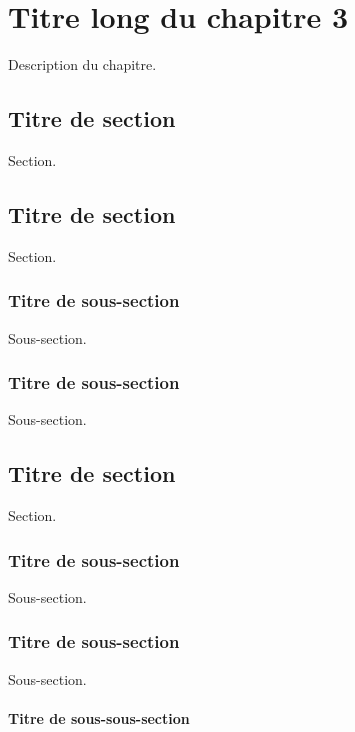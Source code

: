 \chapter[Titre court du chapitre 3] 
        {\singlespacing%
         Titre long du chapitre 3}
         \label{ch:chapitre-3}

    Description du chapitre.

\section{Titre de section}

    Section.

\section{Titre de section}
        
    Section.
        
    \subsection{Titre de sous-section}
    
    Sous-section.
    
    \subsection{Titre de sous-section}

    Sous-section.
        
\section{Titre de section}

    Section.
        
    \subsection{Titre de sous-section}
    
    Sous-section.
    
    \subsection{Titre de sous-section}
    
    Sous-section.
    
    \subsubsection{Titre de sous-sous-section}
    
